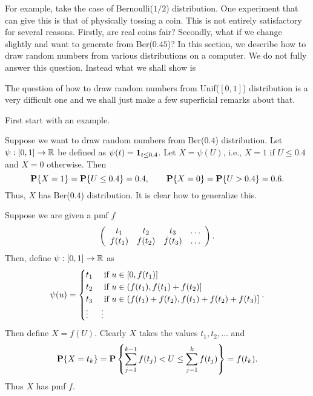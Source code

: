 \documentclass[preprint,  11pt]{amsart}
\begin{document}
For example, take the case of Bernoulli($1/2$) distribution. One experiment that can give this is that of physically tossing a coin. This is not entirely satisfactory for several reasons. Firstly, are real coins fair? Secondly, what if we change slightly and want to generate from Ber($0.45$)? In this section, we describe how to draw random numbers from various distributions on a computer. We do not fully answer this question. Instead what we shall show is




The question of how to draw random numbers from Unif($[0,1]$) distribution is a very difficult one and we shall just make a few superficial remarks about that.

 First start with an example.

\beg Suppose we want to draw random numbers from Ber($0.4$) distribution. Let $\psi:[0,1]\to \R$ be defined as $\psi(t)=\one_{t\le 0.4}$. Let $X=\psi(U)$, i.e., $X=1$ if $U\le 0.4$ and $X=0$ otherwise. Then
$$
\P\{X=1\}=\P\{U\le 0.4\}=0.4, \qquad \P\{X=0\} = \P\{U>0.4\}=0.6.
$$
Thus, $X$ has Ber($0.4$) distribution.
\eeg
It is clear how to generalize this.

 Suppose we are given a pmf $f$
$$
\l(\begin{array}{cccc} t_{1} & t_{2} & t_{3} & \ldots \\ f(t_{1}) & f(t_{2}) & f(t_{3}) & \ldots \end{array} \r).
$$
Then, define $\psi:[0,1]\to \R$ as
$$
\psi(u) = \begin{cases} t_{1} & \mb{ if }u\in [0,f(t_{1})] \\
t_{2} & \mb{ if }u\in (f(t_{1}),f(t_{1})+f(t_{2})] \\
t_{3} & \mb{ if }u\in (f(t_{1})+f(t_{2}),f(t_{1})+f(t_{2})+f(t_{3})] \\
\vdots & \vdots \end{cases}.
$$
Then define $X=f(U)$. Clearly $X$ takes the values $t_{1},t_{2},\ldots$ and
$$
\P\{X=t_{k}\} = \P\l\{\sum_{j=1}^{k-1}f(t_{j})<U\le \sum_{j=1}^{k}f(t_{j})\r\} = f(t_{k}).
$$
Thus $X$ has pmf $f$.
\end{document}
